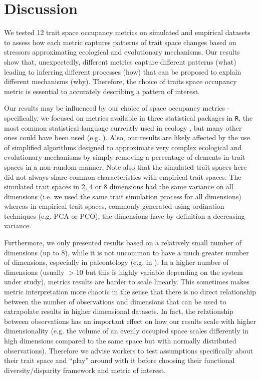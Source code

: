 \documentclass[12pt,letterpaper]{article}
\begin{document}
\section{Discussion}

We tested 12 trait space occupancy metrics on simulated and empirical datasets to assess how each metric captures patterns of trait space changes based on stressors approximating ecological and evolutionary mechanisms.
Our results show that, unexpectedly, different metrics capture different patterns (what) leading to inferring different processes (how) that can be proposed to explain different mechanisms (why).
Therefore, the choice of traits space occupancy metric is essential to accurately describing a pattern of interest.

Our results may be influenced by our choice of space occupancy metrics - specifically, we focused on metrics available in three statistical packages in \texttt{R}, the most common statistical language currently used in ecology \citep{lai2019evaluating}, but many other ones could have been used (e.g. \citealt{guillerme2020shifting}).
Also, our results are likely affected by the use of simplified algorithms designed to approximate very complex ecological and evolutionary mechanisms by simply removing a percentage of elements in trait spaces in a non-random manner.
Note also that the simulated trait spaces here did not always share common characteristics with empirical trait spaces.
The simulated trait spaces in 2, 4 or 8 dimensions had the same variance on all dimensions (i.e. we used the same trait simulation process for all dimensions) whereas in empirical trait spaces, commonly generated using ordination techniques (e.g. PCA or PCO), the dimensions have by definition a decreasing variance.

Furthermore, we only presented results based on a relatively small number of dimensions (up to 8), while it is not uncommon to have a much greater number of dimensions, especially in paleontology (e.g. in \citealt{van2023should}).
In a higher number of dimensions (usually $>$10 but this is highly variable depending on the system under study), metrics results are harder to scale linearly.
This sometimes makes metric interpretation more chaotic \cite{bellman1957dynamic} in the sense that there is no direct relationship between the number of observations and dimensions that can be used to extrapolate results in higher dimensional datasets.
In fact, the relationship between observations has an important effect on how our results scale with higher dimensionality (e.g. the volume of an evenly occupied space scales differently in high dimensions compared to the same space but with normally distributed observations).
Therefore we advise workers to test assumptions specifically about their trait space and ``play'' around with it before choosing their functional diversity/disparity framework and metric of interest.
\end{document}
